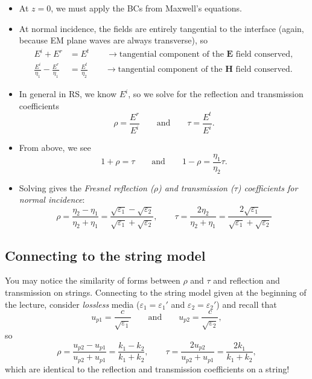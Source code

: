 \documentclass[11pt, oneside]{article}
\begin{document}
\begin{itemize}
	\item At $z = 0$, we must apply the BCs from Maxwell's equations.
	\item At normal incidence, the fields are entirely tangential to the interface (again, because EM plane waves are always transverse), so
	\begin{align}
		E^i + E^r &= E^t \qquad \rightarrow \text{tangential component of the $\mathbf{E}$ field conserved},\\
		\frac{E^i}{\eta_1} - \frac{E^r}{\eta_1} &= \frac{E^t}{\eta_2} \qquad \rightarrow \text{tangential component of the $\mathbf{H}$ field conserved}.
	\end{align}
	\item In general in RS, we know $E^i$, so we solve for the reflection and transmission coefficients
	\begin{equation}
		\rho = \frac{E^r}{E^i} \qquad \text{and} \qquad \tau = \frac{E^t}{E^i}.
	\end{equation}
	\item From above, we see
	\begin{equation}
		1 + \rho = \tau \qquad \text{and} \qquad 1 - \rho = \frac{\eta_1}{\eta_2}\tau.
	\end{equation}
	\item Solving gives the \emph{Fresnel reflection ($\rho$) and transmission ($\tau$) coefficients for normal incidence}:
	\begin{equation}
		\label{e:fresnel}
		\rho = \frac{\eta_2 - \eta_1}{\eta_2 + \eta_1} = \frac{\sqrt{\varepsilon_1} - \sqrt{\varepsilon_2}}{\sqrt{\varepsilon_1} + \sqrt{\varepsilon_2}},
		\qquad
		\tau = \frac{2\eta_2}{\eta_2 + \eta_1} = \frac{2\sqrt{\varepsilon_1}}{\sqrt{\varepsilon_1} + \sqrt{\varepsilon_2}}
	\end{equation}
\end{itemize}

\subsection{Connecting to the string model}

You may notice the similarity of forms between $\rho$ and $\tau$ and reflection and transmission on strings. Connecting to the string model given at the beginning of the lecture, consider \emph{lossless} media ($\varepsilon_1 = \varepsilon_1'$ and $\varepsilon_2 = \varepsilon_2'$) and recall that
\begin{equation}
	u_{p1} = \frac{c}{\sqrt{\varepsilon_1}} \qquad \text{and} \qquad u_{p2} = \frac{c}{\sqrt{\varepsilon_2}},
\end{equation}
so
\begin{equation}
	\rho = \frac{u_{p2} - u_{p1}}{u_{p2} + u_{p1}} = \frac{k_1 - k_2}{k_1 + k_2},
	\qquad
	\tau = \frac{2u_{p2}}{u_{p2} + u_{p1}} = \frac{2k_1}{k_1 + k_2},
\end{equation}
which are identical to the reflection and transmission coefficients on a string!
\end{document}
